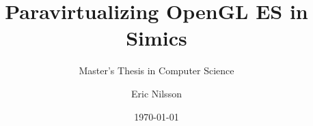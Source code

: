 \title{Paravirtualizing OpenGL ES in Simics}
\subtitle{Master's Thesis in Computer Science}
\author{Eric Nilsson}
\date{\today}

\begin{frame}
	\titlepage
\end{frame}

